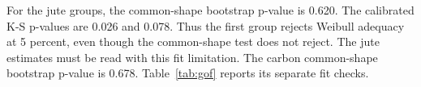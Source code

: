 For the jute groups, the common-shape bootstrap p-value is 0.620. The calibrated K-S p-values are 0.026 and 0.078. Thus the first group rejects Weibull adequacy at 5 percent, even though the common-shape test does not reject. The jute estimates must be read with this fit limitation. The carbon common-shape bootstrap p-value is 0.678. Table~\ref{tab:gof} reports its separate fit checks.
